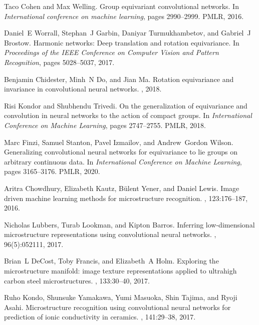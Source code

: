 \documentclass[12pt,reqno]{article}
\begin{document}
\begin{thebibliography}{10}
Taco Cohen and Max Welling.
\newblock Group equivariant convolutional networks.
\newblock In {\em International conference on machine learning}, pages
2990--2999. PMLR, 2016.

Daniel~E Worrall, Stephan~J Garbin, Daniyar Turmukhambetov, and Gabriel~J
Brostow.
\newblock Harmonic networks: Deep translation and rotation equivariance.
\newblock In {\em Proceedings of the {IEEE} Conference on Computer Vision and
Pattern Recognition}, pages 5028--5037, 2017.

Benjamin Chidester, Minh~N Do, and Jian Ma.
\newblock Rotation equivariance and invariance in convolutional neural
networks.
, 2018.

Risi Kondor and Shubhendu Trivedi.
\newblock On the generalization of equivariance and convolution in neural
networks to the action of compact groups.
\newblock In {\em International Conference on Machine Learning}, pages
2747--2755. PMLR, 2018.

Marc Finzi, Samuel Stanton, Pavel Izmailov, and Andrew~Gordon Wilson.
\newblock Generalizing convolutional neural networks for equivariance to lie
groups on arbitrary continuous data.
\newblock In {\em International Conference on Machine Learning}, pages
3165--3176. PMLR, 2020.

Aritra Chowdhury, Elizabeth Kautz, B{\"u}lent Yener, and Daniel Lewis.
\newblock Image driven machine learning methods for microstructure recognition.
, 123:176--187, 2016.

Nicholas Lubbers, Turab Lookman, and Kipton Barros.
\newblock Inferring low-dimensional microstructure representations using
convolutional neural networks.
, 96(5):052111, 2017.

Brian~L DeCost, Toby Francis, and Elizabeth~A Holm.
\newblock Exploring the microstructure manifold: image texture representations
applied to ultrahigh carbon steel microstructures.
, 133:30--40, 2017.

Ruho Kondo, Shunsuke Yamakawa, Yumi Masuoka, Shin Tajima, and Ryoji Asahi.
\newblock Microstructure recognition using convolutional neural networks for
prediction of ionic conductivity in ceramics.
, 141:29--38, 2017.


\end{thebibliography}
\end{document}
